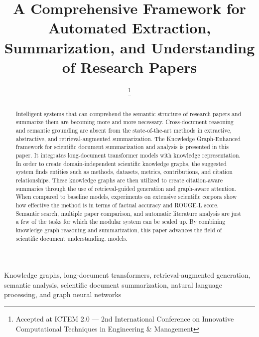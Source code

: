 \documentclass[conference]{IEEEtran}
\begin{document}
\title{A Comprehensive Framework for Automated Extraction, Summarization, and Understanding of Research Papers}

\author{
\thanks{Accepted at ICTEM 2.0 — 2nd International Conference on Innovative Computational Techniques in Engineering \& Management}
}

\maketitle

\begin{abstract}
Intelligent systems that can comprehend the semantic structure of research papers and summarize them are becoming more and more necessary. Cross-document reasoning and semantic grounding are absent from the state-of-the-art methods in extractive, abstractive, and retrieval-augmented summarization. The Knowledge Graph-Enhanced framework for scientific document summarization and analysis is presented in this paper. It integrates long-document transformer models with knowledge representation. In order to create domain-independent scientific knowledge graphs, the suggested system finds entities such as methods, datasets, metrics, contributions, and citation relationships. These knowledge graphs are then utilized to create citation-aware summaries through the use of retrieval-guided generation and graph-aware attention. When compared to baseline models, experiments on extensive scientific corpora show how effective the method is in terms of factual accuracy and ROUGE-L score. Semantic search, multiple paper comparison, and automatic literature analysis are just a few of the tasks for which the modular system can be scaled up. By combining knowledge graph reasoning and summarization, this paper advances the field of scientific document understanding.
models.
\end{abstract}

\begin{IEEEkeywords}
Knowledge graphs, long-document transformers, retrieval-augmented generation, semantic analysis, scientific document summarization, natural language processing, and graph neural networks
\end{IEEEkeywords}
\end{document}
